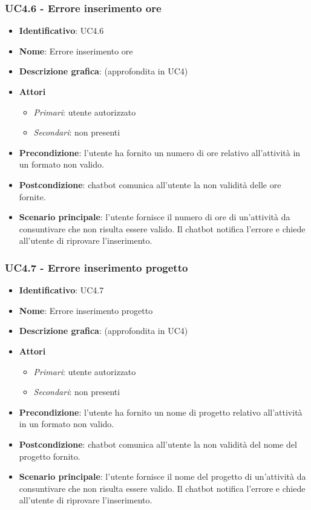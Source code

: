 \subsubsection{UC4.6 - Errore inserimento ore}
\begin{itemize}
    \item \textbf{Identificativo}: UC4.6
    \item \textbf{Nome}: Errore inserimento ore
    \item \textbf{Descrizione grafica}: (approfondita in UC4)
    \item \textbf{Attori}
        \begin{itemize} 
            \item \textit{Primari}: utente autorizzato
            \item \textit{Secondari}: non presenti
        \end{itemize}
    \item \textbf{Precondizione}: l'utente ha fornito un numero di ore relativo all'attività in un formato non valido. 
    \item \textbf{Postcondizione}: chatbot comunica all'utente la non validità delle ore fornite.
    \item \textbf{Scenario principale}: l'utente fornisce il numero di ore di un'attività da consuntivare che non risulta essere valido. Il chatbot notifica l'errore e chiede all'utente di riprovare l'inserimento. 
\end{itemize}
\newpage

\subsubsection{UC4.7 - Errore inserimento progetto}
\begin{itemize}
    \item \textbf{Identificativo}: UC4.7
    \item \textbf{Nome}: Errore inserimento progetto
    \item \textbf{Descrizione grafica}: (approfondita in UC4)
    \item \textbf{Attori}
        \begin{itemize} 
            \item \textit{Primari}: utente autorizzato
            \item \textit{Secondari}: non presenti
        \end{itemize}
    \item \textbf{Precondizione}: l'utente ha fornito un nome di progetto relativo all'attività in un formato non valido. 
    \item \textbf{Postcondizione}: chatbot comunica all'utente la non validità del nome del progetto fornito.
    \item \textbf{Scenario principale}: l'utente fornisce il nome del progetto di un'attività da consuntivare che non risulta essere valido. Il chatbot notifica l'errore e chiede all'utente di riprovare l'inserimento. 
\end{itemize}

